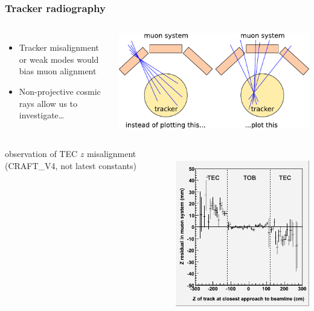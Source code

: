 \documentclass[compress]{beamer}
\begin{document}
\begin{frame}
\frametitle{Tracker radiography}

\vspace{0.25 cm}
\begin{columns}
\begin{itemize}
\item Tracker misalignment or weak modes would bias muon alignment
\item Non-projective cosmic rays allow us to investigate\ldots
\end{itemize}

\includegraphics[width=\linewidth]{tracker_xray.pdf}
\end{columns}

\vspace{0.25 cm}
\begin{columns}

observation of TEC $z$ misalignment {\scriptsize (CRAFT\_V4, not latest constants)}

\mbox{ } \hfill \includegraphics[width=0.7\linewidth]{zresid_from_tracker_outerbottom.png} \hfill \mbox{ }


\end{columns}
\end{frame}
\end{document}
